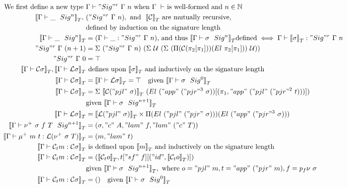 \begin{align*}
  \text{We first define a new type }& \goodType{\Gamma}{\Sigr{\Gamma}{n}}{}  \text{ when } \goodCtx{\Gamma}{}  \text{ is well-formed and } n \in \mathbb{N} \\
  \denotesT{\goodSig{\Gamma}{\_}{n}},\ &({\Sigr{\Gamma}{n}}), \text{ and } \ \denotesT{\cC} \text{ are mutually recursive, } \\
  & \text{defined by induction on the signature length} \\  
  \denotesT{\goodSig{\Gamma}{\_}{n}} &= (\goodTerm{\Gamma}{\_}{\Sigr{\Gamma}{n}}) \text{, and thus } \denotesT{\goodSig{\Gamma}{\sigma}{n}} \text{defined} \iff \goodTerm{\Gamma}{\denotesT{\sigma}}{\Sigr{\Gamma}{n}} \\ 
  {\Sigr{\Gamma}{(n+1)}} &= 
    \Sigma~(\Sigr{\Gamma}{n})
          ~(\Sigma~\cU
                  ~(\Sigma~(\Pi(\cC (\pi_2[\pi_1]))(El~\pi_2[\pi_1]))~\cU)) \\
  \Sigr{\Gamma}{0} &= \top \\
  \denotesT{\goodType{\Gamma}{\cC \sigma}{}}, \denotesT{\goodType{\Gamma}{\cL\sigma}{}} &\text{ defines upon } \denotesT{\sigma} 
  \text{ and inductively on the signature length} \\
  \denotesT{\goodType{\Gamma}{\cC \sigma}{}} &= \denotesT{\goodType{\Gamma}{\cL\sigma}{}} = \top \quad
      \text{given } \denotesT{\goodSig{\Gamma}{\sigma}{0}} \\ 
  \denotesT{\goodType{\Gamma}{\cC \sigma}{}} &= 
    \Sigma~\denotesT{\cC ("pjl"~\sigma)}~(El \ ("app"~("pjr"^3~\sigma))[(\pi_1, "app"~("pjl"~("pjr"^2~t)))]) \\
      &\text{given } \denotesT{\goodSig{\Gamma}{\sigma}{n+1}} \\
  \denotesT{\goodType{\Gamma}{\cL\sigma}{}} &=
  \denotesT{\cL("pjl"~\sigma)} \times \Pi(El~("pjl"~("pjr"~\sigma)))(El~("app"~("pjr"^3~\sigma))) \\
  \denotesT{\goodSig{\Gamma}{\nu^+~\sigma~f~T}{n+1}} &= (\sigma, "c"~A, "lam"~f, "lam"~("c"~T)) \\ 
  \denotesT{\goodTerm{\Gamma}{\mu^+~m~t}{\cL(\nu^+~\sigma~T)}} &= (m, "lam"~t) \\ 
  \denotesT{\goodTerm{\Gamma}{\cCt m}{\cC\sigma}} & \text{ is defined upon } \denotesT{m} \text{ and inductively on the signature length} \\ 
  \denotesT{\goodTerm{\Gamma}{\cCt m}{\cC\sigma}} &= 
  (\denotesT{\cCt o}, t["sf"~f][("id", \denotesT{\cCt o})]) \\
  & \text{given } \denotesT{\goodSig{\Gamma}{\sigma}{n+1}}, \text{ where } o = "pjl"~m, t = "app"~("pjr"~m), f = p_f\nu~\sigma \\ 
  \denotesT{\goodTerm{\Gamma}{\cCt m}{\cC \sigma}} &= () \quad \text{given } \denotesT{\goodSig{\Gamma}{\sigma}{0}}
\end{align*}
